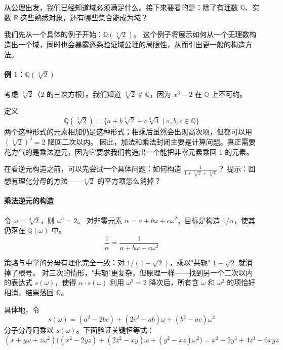 从公理出发，我们已经知道域必须满足什么。接下来要看的是：除了有理数 $\mathbb{Q}$、实数 $\mathbb{R}$ 这些熟悉对象，还有哪些集合能成为域？

我们先从一个具体的例子开始：$\mathbb{Q}(\sqrt[3]{2})$。
这个例子将展示如何从一个无理数构造出一个域，同时也会暴露逐条验证域公理的局限性，从而引出更一般的构造方法。

\paragraph*{例 1：$\mathbb{Q}(\sqrt[3]{2})$}

考虑 $\sqrt[3]{2}$（$2$ 的三次方根）。我们知道 $\sqrt[3]{2} \notin \mathbb{Q}$，因为 $x^3 - 2$ 在 $\mathbb{Q}$ 上不可约。

定义
\[\mathbb{Q}(\sqrt[3]{2}) = \{a + b\sqrt[3]{2} + c\sqrt[3]{4} \mid a, b, c \in \mathbb{Q}\}\]
两个这种形式的元素相加仍是这种形式；相乘后虽然会出现高次项，但都可以用 $(\sqrt[3]{2})^3=2$ 降回二次以内。
因此，加法和乘法封闭主要是计算问题。真正需要花力气的是乘法逆元，因为它要求我们构造出一个能把非零元素乘回 $1$ 的元素。

在看逆元构造之前，可以先尝试一个具体问题：如何构造 $\frac{1}{1 + \sqrt[3]{2} + \sqrt[3]{4}}$？
提示：回想有理化分母的方法——$\sqrt[3]{2}$ 的平方项怎么消掉？

\paragraph*{乘法逆元的构造}
令 $\omega = \sqrt[3]{2}$，则 $\omega^3 = 2$。
对非零元素 $\alpha = a + b\omega + c\omega^2$，目标是构造 $1/\alpha$，使其仍落在 $\mathbb{Q}(\omega)$ 中。
\[\frac{1}{\alpha} = \frac{1}{a + b\omega + c\omega^2}\]

策略与中学的分母有理化完全一致：对 $1/(1+\sqrt{2})$，乘以"共轭" $1-\sqrt{2}$ 就消掉了根号。
对三次的情形，"共轭"更复杂，但原理一样——找到另一个二次以内的表达式 $s(\omega)$，使得 $\alpha \cdot s(\omega)$ 利用 $\omega^3 = 2$ 降次后，所有含 $\omega$ 和 $\omega^2$ 的项恰好相消，结果落回 $\mathbb{Q}$。

具体地，令
\[s(\omega) = (a^2 - 2bc) + (2c^2 - ab)\omega + (b^2 - ac)\omega^2\]
分子分母同乘以 $s(\omega)$。下面验证关键恒等式：
\[(x + y\omega + z\omega^2)\big((x^2 - 2yz) + (2z^2 - xy)\omega + (y^2 - xz)\omega^2\big) = x^3 + 2y^3 + 4z^3 - 6xyz\]

